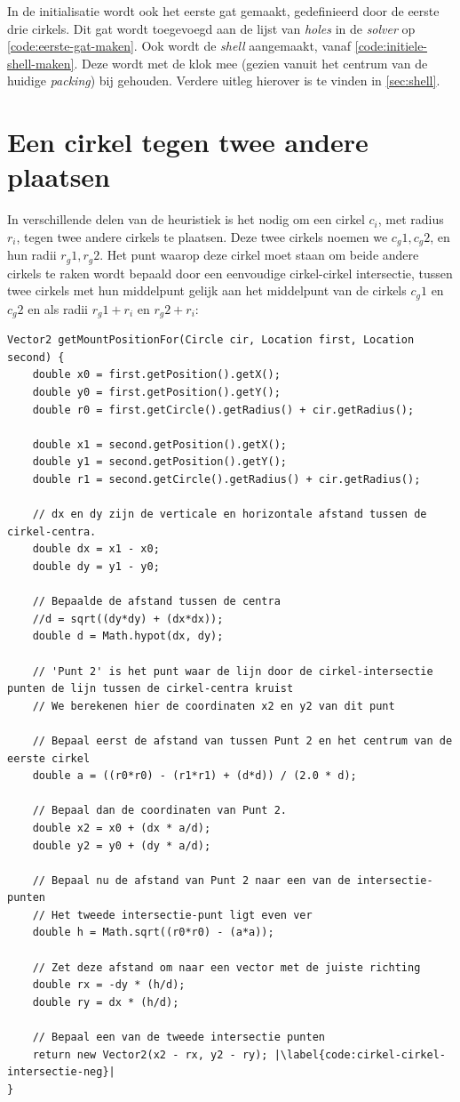 \documentclass[12pt,a4paper,oneside]{book}
\begin{document}
In de initialisatie wordt ook het eerste gat gemaakt, gedefinieerd door de eerste drie cirkels.
Dit gat wordt toegevoegd aan de lijst van \textit{holes} in de \textit{solver} op \autoref{code:eerste-gat-maken}.
Ook wordt de \textit{shell} aangemaakt, vanaf \autoref{code:initiele-shell-maken}.
Deze wordt met de klok mee (gezien vanuit het centrum van de huidige \textit{packing}) bij gehouden.
Verdere uitleg hierover is te vinden in \autoref{sec:shell}.

\section{Een cirkel tegen twee andere plaatsen} \label{sec:een-cirkel-tegen-twee-andere-plaatsen}

In verschillende delen van de heuristiek is het nodig om een cirkel $c_i$, met radius $r_i$, tegen twee andere cirkels te plaatsen.
Deze twee cirkels noemen we $c_g1, c_g2$, en hun radii $r_g1, r_g2$.
Het punt waarop deze cirkel moet staan om beide andere cirkels te raken wordt bepaald door een eenvoudige cirkel-cirkel intersectie, tussen twee cirkels met hun middelpunt gelijk aan het middelpunt van de cirkels $c_g1$ en $c_g2$ en als radii $r_g1+r_i$ en $r_g2+r_i$:

\begin{lstlisting}
Vector2 getMountPositionFor(Circle cir, Location first, Location second) {
	double x0 = first.getPosition().getX();
	double y0 = first.getPosition().getY();
	double r0 = first.getCircle().getRadius() + cir.getRadius();

	double x1 = second.getPosition().getX();
	double y1 = second.getPosition().getY();
	double r1 = second.getCircle().getRadius() + cir.getRadius();

	// dx en dy zijn de verticale en horizontale afstand tussen de cirkel-centra.
	double dx = x1 - x0;
	double dy = y1 - y0;

	// Bepaalde de afstand tussen de centra
	//d = sqrt((dy*dy) + (dx*dx));
	double d = Math.hypot(dx, dy);

	// 'Punt 2' is het punt waar de lijn door de cirkel-intersectie punten de lijn tussen de cirkel-centra kruist
	// We berekenen hier de coordinaten x2 en y2 van dit punt

	// Bepaal eerst de afstand van tussen Punt 2 en het centrum van de eerste cirkel
	double a = ((r0*r0) - (r1*r1) + (d*d)) / (2.0 * d);

	// Bepaal dan de coordinaten van Punt 2.
	double x2 = x0 + (dx * a/d);
	double y2 = y0 + (dy * a/d);

	// Bepaal nu de afstand van Punt 2 naar een van de intersectie-punten
	// Het tweede intersectie-punt ligt even ver
	double h = Math.sqrt((r0*r0) - (a*a));

	// Zet deze afstand om naar een vector met de juiste richting
	double rx = -dy * (h/d);
	double ry = dx * (h/d);

	// Bepaal een van de tweede intersectie punten
	return new Vector2(x2 - rx, y2 - ry); |\label{code:cirkel-cirkel-intersectie-neg}|
}
\end{lstlisting}
\end{document}
